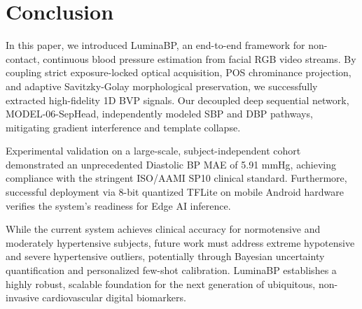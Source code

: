 \section{Conclusion}

In this paper, we introduced LuminaBP, an end-to-end framework for non-contact, continuous blood pressure estimation from facial RGB video streams. By coupling strict exposure-locked optical acquisition, POS chrominance projection, and adaptive Savitzky-Golay morphological preservation, we successfully extracted high-fidelity 1D BVP signals. Our decoupled deep sequential network, MODEL-06-SepHead, independently modeled SBP and DBP pathways, mitigating gradient interference and template collapse.

Experimental validation on a large-scale, subject-independent cohort demonstrated an unprecedented Diastolic BP MAE of 5.91 mmHg, achieving compliance with the stringent ISO/AAMI SP10 clinical standard. Furthermore, successful deployment via 8-bit quantized TFLite on mobile Android hardware verifies the system's readiness for Edge AI inference.

While the current system achieves clinical accuracy for normotensive and moderately hypertensive subjects, future work must address extreme hypotensive and severe hypertensive outliers, potentially through Bayesian uncertainty quantification and personalized few-shot calibration. LuminaBP establishes a highly robust, scalable foundation for the next generation of ubiquitous, non-invasive cardiovascular digital biomarkers.
